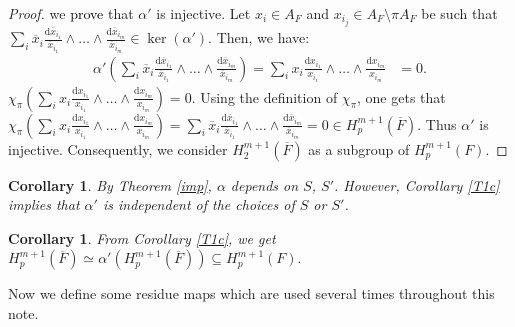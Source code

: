 \documentclass[times,10pt]{amsart}
\renewcommand{\cong}{\simeq}
\newtheorem{cor}[thm]{Corollary}%
\begin{document}
{\begin{proof}
 we \textcolor{black}{prove} {that} $\alpha'$ is injective. Let  $x_i\in A_F$ and $x_{i_j} \in A_F\setminus\pi A_F$ be such that  $\displaystyle{\sum_{i} { \overline{x}_i\frac{\mathrm{d}\overline{x}_{i_1}}{\overline{x}_{i_1}}\wedge \ldots \wedge \frac{\mathrm{d}\overline{x}_{i_m}}{\overline{x}_{i_m}}}\in \ker(\alpha')}. $ Then, we have: 
     \begin{align*}
         \alpha'\left( \sum_{i} { \overline{x}_i\frac{\mathrm{d}\overline{x}_{i_1}}{\overline{x}_{i_1}}\wedge \ldots \wedge \frac{\mathrm{d}\overline{x}_{i_m}}{\overline{x}_{i_m}}}\right)= \sum_{i} { x_i\frac{\mathrm{d}x_{i_1}}{x_{i_1}}\wedge \ldots \wedge \frac{\mathrm{d}x_{i_m}}{x_{i_m}}}&=0.  \end{align*}  $\displaystyle{
             \chi_{\pi}\left( \sum_{i} { x_i\frac{\mathrm{d}x_{i_1}}{x_{i_1}}\wedge \ldots \wedge \frac{\mathrm{d}x_{i_m}}{x_{i_m}}}\right)=0}. $
        Using the definition of $\chi_{\pi}$, one gets that $ \displaystyle{\chi_{\pi}\left( \sum_{i} { x_i\frac{\mathrm{d}x_{i_1}}{x_{i_1}}\wedge \ldots \wedge \frac{\mathrm{d}x_{i_m}}{x_{i_m}}}\right)= \sum_{i} { \overline{x}_i\frac{\mathrm{d}\overline{x}_{i_1}}{\overline{x}_{i_1}}\wedge \ldots \wedge \frac{\mathrm{d}\overline{x}_{i_m}}{\overline{x}_{i_m}}}}=0\in H_p^{m+1}(\overline{F}) $.
      Thus $ \alpha'$ is injective. Consequently, we  consider $H_2^{m+1}(\overline{F})$ as a subgroup of $H_p^{m+1}( F).$
 \end{proof}

 \begin{cor}\label{T2c}
     By  Theorem \ref{imp},  $\alpha $ depends  on  $S$, $S'$. However, Corollary \ref{T1c} implies that  $\alpha'$ is independent of the choices of $S$ or $S'$.
 \end{cor}
 \begin{cor}\label{T3c}
     From Corollary \ref{T1c}, we get $ H_p^{m+1}(\overline{F})\cong \alpha'(H_p^{m+1}(\overline{F})) \subseteq H_p^{m+1}(F).$
 \end{cor}
\vspace{2mm}

{Now we define some residue maps which are used several times throughout this note}.

}
\end{document}
